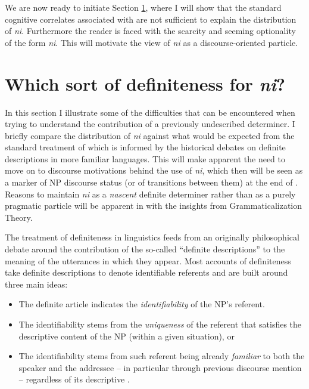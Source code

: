 \documentclass[output=paper
,modfonts
,nonflat]{langsci/langscibook}
\begin{document}
We are now ready to initiate Section \ref{sec:pico:2}, where I will show that the standard cognitive correlates associated with  are not sufficient to explain the distribution of \textit{ni}. Furthermore the reader is faced with the scarcity and seeming optionality of the form \textit{ni}. This will motivate the view of \textit{ni} as a discourse-oriented particle.

\section{Which sort of definiteness for \textit{ni}?}\label{sec:pico:2}

In this section I illustrate some of the difficulties that can be encountered when trying to understand the contribution of a previously undescribed determiner. I briefly compare the distribution of \textit{ni} against what would be expected from the standard treatment of  which is informed by the historical debates on definite descriptions in more familiar languages. This will make apparent the need to move on to discourse motivations behind the use of \textit{ni}, which then will be seen as a marker of NP discourse status (or of transitions between them) at the end of . Reasons to maintain \textit{ni} as a \textit{nascent} definite determiner rather than as a purely pragmatic particle will be apparent in  with the insights from Grammaticalization Theory.

The treatment of definiteness in linguistics feeds from an originally philosophical debate around the contribution of the so-called ``definite descriptions'' to the meaning of the utterances in which they appear. Most accounts of definiteness take definite descriptions to denote identifiable referents and are built around three main ideas:

\begin{itemize}
	\item The definite article indicates the \textit{identifiability} of the NP's referent.
	\item The identifiability stems from the \textit{uniqueness} of the referent that satisfies the descriptive content of the NP (within a given situation), or
	\item The identifiability stems from such referent being already \textit{familiar} to both the speaker and the addressee -- in particular through previous discourse mention -- regardless of its descriptive .
\end{itemize}
\end{document}
